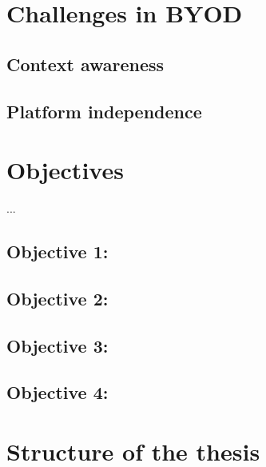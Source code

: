 \section{Challenges in BYOD}
\label{sec:intro:challenges}



\subsection{Context awareness}
\label{subsec:context}


\subsection{Platform independence}
\label{subsec:platf_ind}


\section{Objectives}                     
\label{sec:intro:motivation}

...

\newcommand{\objectiveparadigm}{}

 \subsection*{Objective 1: \objectiveparadigm}
\label{subsec:intro:obj:problems}

\newcommand{\objectivemethodology}{}

\subsection*{Objective 2: \objectivemethodology} 
\label{subsec:intro:obj:methodology}

\newcommand{\objectiveframework}{}

\subsection*{Objective 3: \objectiveframework}
\label{subsec:intro:obj:fwork}

\newcommand{\objectiveresearch}{} 

\subsection*{Objective 4: \objectiveresearch}
\label{subsec:intro:obj:applications}



\section{Structure of the thesis}
\label{sec:intro:structure}


